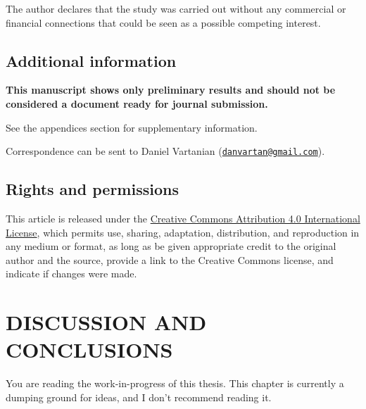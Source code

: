 \documentclass[
  12pt,
  a4paper,
  oneside]{tesesusp}
\begin{document}
The author declares that the study was carried out without any
commercial or financial connections that could be seen as a possible
competing interest.

\hypertarget{additional-information}{%
\section{Additional information}\label{additional-information}}

\textbf{This manuscript shows only preliminary results and should not be
considered a document ready for journal submission.}

See the appendices section for supplementary information.

Correspondence can be sent to Daniel Vartanian
(\href{mailto:danvartan@gmail.com}{\nolinkurl{danvartan@gmail.com}}).

\hypertarget{rights-and-permissions}{%
\section{Rights and permissions}\label{rights-and-permissions}}

This article is released under the
\href{http://creativecommons.org/licenses/by/4.0/}{Creative Commons
Attribution 4.0 International License}, which permits use, sharing,
adaptation, distribution, and reproduction in any medium or format, as
long as be given appropriate credit to the original author and the
source, provide a link to the Creative Commons license, and indicate if
changes were made.


\hypertarget{discussion-and-conclusions}{%
\chapter{DISCUSSION AND CONCLUSIONS}\label{discussion-and-conclusions}}

\begin{tcolorbox}[enhanced jigsaw, rightrule=.15mm, colback=white, colbacktitle=quarto-callout-important-color!10!white, toptitle=1mm, bottomtitle=1mm, toprule=.15mm, bottomrule=.15mm, colframe=quarto-callout-important-color-frame, opacitybacktitle=0.6, opacityback=0, coltitle=black, left=2mm, breakable, titlerule=0mm, title=\textcolor{quarto-callout-important-color}{\faExclamation}\hspace{0.5em}{Important}, arc=.35mm, leftrule=.75mm]

You are reading the work-in-progress of this thesis. This chapter is
currently a dumping ground for ideas, and I don't recommend reading it.

\end{tcolorbox}
\end{document}
